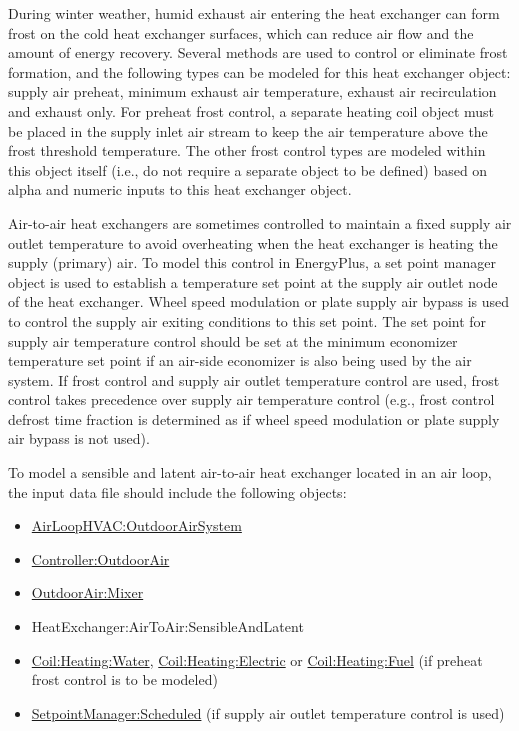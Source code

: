 During winter weather, humid exhaust air entering the heat exchanger can form frost on the cold heat exchanger surfaces, which can reduce air flow and the amount of energy recovery. Several methods are used to control or eliminate frost formation, and the following types can be modeled for this heat exchanger object: supply air preheat, minimum exhaust air temperature, exhaust air recirculation and exhaust only. For preheat frost control, a separate heating coil object must be placed in the supply inlet air stream to keep the air temperature above the frost threshold temperature. The other frost control types are modeled within this object itself (i.e., do not require a separate object to be defined) based on alpha and numeric inputs to this heat exchanger object.

Air-to-air heat exchangers are sometimes controlled to maintain a fixed supply air outlet temperature to avoid overheating when the heat exchanger is heating the supply (primary) air. To model this control in EnergyPlus, a set point manager object is used to establish a temperature set point at the supply air outlet node of the heat exchanger. Wheel speed modulation or plate supply air bypass is used to control the supply air exiting conditions to this set point. The set point for supply air temperature control should be set at the minimum economizer temperature set point if an air-side economizer is also being used by the air system. If frost control and supply air outlet temperature control are used, frost control takes precedence over supply air temperature control (e.g., frost control defrost time fraction is determined as if wheel speed modulation or plate supply air bypass is not used).

To model a sensible and latent air-to-air heat exchanger located in an air loop, the input data file should include the following objects:

\begin{itemize}
\item
  \hyperref[airloophvacoutdoorairsystem]{AirLoopHVAC:OutdoorAirSystem}
\item
  \hyperref[controlleroutdoorair]{Controller:OutdoorAir}
\item
  \hyperref[outdoorairmixer]{OutdoorAir:Mixer}
\item
  HeatExchanger:AirToAir:SensibleAndLatent
\item
  \hyperref[coilheatingwater]{Coil:Heating:Water}, \hyperref[coilheatingelectric]{Coil:Heating:Electric} or \hyperref[coilheatinggas-000]{Coil:Heating:Fuel} (if preheat frost control is to be modeled)
\item
  \hyperref[setpointmanagerscheduled]{SetpointManager:Scheduled} (if supply air outlet temperature control is used)
\end{itemize}

